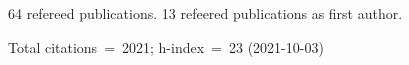 64 refereed publications. 13 refeered publications as first author.

Total citations~=~2021; h-index~=~23 (2021-10-03)